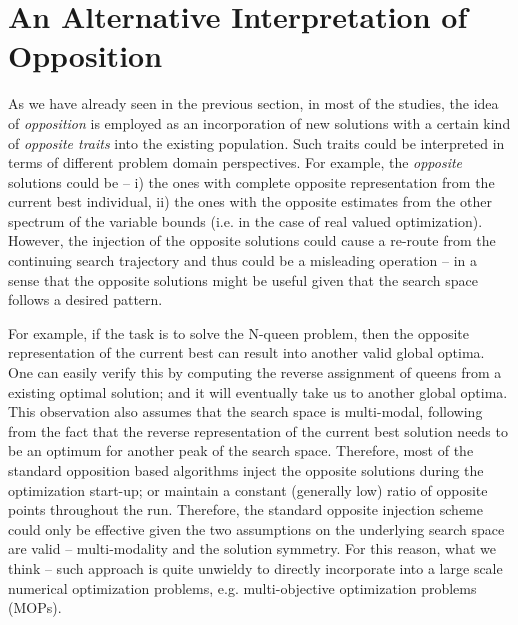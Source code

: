 \documentclass[journal]{IEEEtran}
\begin{document}

 

\section{An Alternative Interpretation of Opposition}
\label{sec:alternative-interpretation}
As we have already seen in the previous section, in most of the studies, the idea of \textit{opposition} is employed as an incorporation of new solutions with a certain kind of \textit{opposite traits} into the existing population. Such traits could be interpreted in terms of different problem domain perspectives. For example, the \textit{opposite} solutions could be -- i) the ones with complete opposite representation from the current best individual, ii) the ones with the opposite estimates from the other spectrum of the variable bounds (i.e. in the case of real valued optimization). However, the injection of the opposite solutions could cause a re-route from the continuing search trajectory and thus could be a misleading operation -- in a sense that the opposite solutions might be useful given that the search space follows a desired pattern. 

For example, if the task is to solve the N-queen problem, then the opposite representation of the current best can result into another valid global optima. One can easily verify this by computing the reverse assignment of queens from a existing optimal solution; and it will eventually take us to another global optima. This observation also assumes that the search space is multi-modal, following from the fact that the reverse representation of the current best solution needs to be an optimum for another peak of the search space. Therefore, most of the standard opposition based algorithms inject the opposite solutions during the optimization start-up; or maintain a constant (generally low) ratio of opposite points throughout the run. Therefore, the standard opposite injection scheme could only be effective given the two assumptions on the underlying search space are valid -- multi-modality and the solution symmetry. For this reason, what we think -- such approach is quite unwieldy to directly incorporate into a large scale numerical optimization problems, e.g. multi-objective optimization problems (MOPs).
\end{document}
